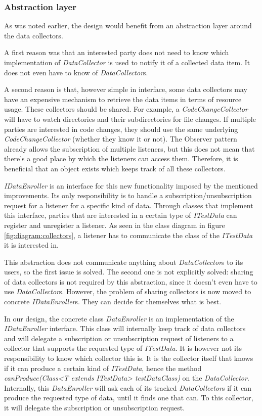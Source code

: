 \documentclass[i2]{oss}
\newcommand{\class}[1]{\emph{#1}}
\newcommand{\method}[1]{\emph{#1}}
\begin{document}
\subsubsection{Abstraction layer}

As was noted earlier, the design would benefit from an abstraction layer around the data collectors.

A first reason was that an interested party does not need to know which implementation of \class{DataCollector} is used to notify it of a collected data item. It does not even have to know of \class{DataCollector}s.

A second reason is that, however simple in interface, some data collectors may have an expensive mechanism to retrieve the data items in terms of resource usage.
These collectors should be shared.
For example, a \class{CodeChangeCollector} will have to watch directories and their subdirectories for file changes.
If multiple parties are interested in code changes, they should use the same underlying \class{CodeChangeCollector} (whether they know it or not).
The Observer pattern already allows the subscription of multiple listeners, but this does not mean that there's a good place by which the listeners can access them. 
Therefore, it is beneficial that an object exists which keeps track of all these collectors.

\class{IDataEnroller} is an interface for this new functionality imposed by the mentioned improvements.
Its only responsibility is to handle a subscription/unsubscription request for a listener for a specific kind of data.
Through classes that implement this interface, parties that are interested in a certain type of \class{ITestData} can register and unregister a listener.
As seen in the class diagram in figure \ref{fig:diagram:collectors}, a listener has to communicate the class of the \class{ITestData} it is interested in.

This abstraction does not communicate anything about \class{DataCollector}s to its users, so the first issue is solved.
The second one is not explicitly solved: sharing of data collectors is not required by this abstraction, since it doesn't even have to use \class{DataCollector}s.
However, the problem of sharing collectors is now moved to concrete \class{IDataEnroller}s.
They can decide for themselves what is best.

In our design, the concrete class \class{DataEnroller} is an implementation of the \class{IDataEnroller} interface.
This class will internally keep track of data collectors and will delegate a subscription or unsubscription request of listeners to a collector that supports the requested type of \class{ITestData}.
It is however not its responsibility to know which collector this is.
It is the collector itself that knows if it can produce a certain kind of \class{ITestData}, hence the method \method{canProduce(Class<T extends ITestData> testDataClass)} on the \class{DataCollector}.
Internally, this \class{DataEnroller} will ask each of its tracked \class{DataCollector}s if it can produce the requested type of data, until it finds one that can.
To this collector, it will delegate the subscription or unsubscription request.
\end{document}
